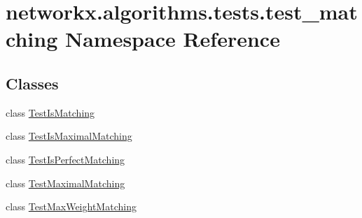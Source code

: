 \hypertarget{namespacenetworkx_1_1algorithms_1_1tests_1_1test__matching}{}\section{networkx.\+algorithms.\+tests.\+test\+\_\+matching Namespace Reference}
\label{namespacenetworkx_1_1algorithms_1_1tests_1_1test__matching}
\subsection*{Classes}
\begin{DoxyCompactItemize}
\item 
class \hyperlink{classnetworkx_1_1algorithms_1_1tests_1_1test__matching_1_1TestIsMatching}{Test\+Is\+Matching}
\item 
class \hyperlink{classnetworkx_1_1algorithms_1_1tests_1_1test__matching_1_1TestIsMaximalMatching}{Test\+Is\+Maximal\+Matching}
\item 
class \hyperlink{classnetworkx_1_1algorithms_1_1tests_1_1test__matching_1_1TestIsPerfectMatching}{Test\+Is\+Perfect\+Matching}
\item 
class \hyperlink{classnetworkx_1_1algorithms_1_1tests_1_1test__matching_1_1TestMaximalMatching}{Test\+Maximal\+Matching}
\item 
class \hyperlink{classnetworkx_1_1algorithms_1_1tests_1_1test__matching_1_1TestMaxWeightMatching}{Test\+Max\+Weight\+Matching}
\end{DoxyCompactItemize}
